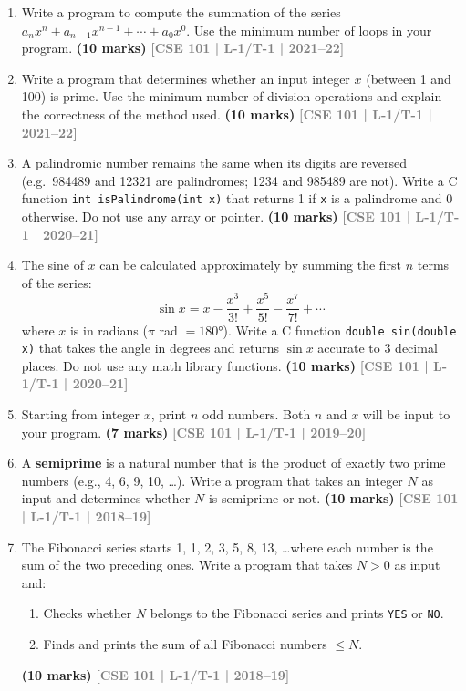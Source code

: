 \documentclass[12pt,a3paper]{article}
\newcommand{\yr}[1]{\hfill\textcolor{gray}{\small\textbf{[#1]}}}
\newcommand{\mk}[1]{\textcolor{orange!70!black}{\small\textbf{(#1 marks)}}}
\begin{document}
\begin{enumerate}
\begin{lstlisting}
int a[10];
int i, j;
j = last_digit_of_your_studentID;
for (i=0; i<10; i++)
    a[i] = 5-i;
printf("%d\n", a[j]);
\end{lstlisting}
Show your calculation.
\mk{7} \yr{CSE 101 | L-1/T-1 | 2022--23}

\item Write a program to compute the summation of the series $a_n x^n + a_{n-1} x^{n-1} + \cdots + a_0 x^0$. Use the minimum number of loops in your program.
\mk{10} \yr{CSE 101 | L-1/T-1 | 2021--22}

\item Write a program that determines whether an input integer $x$ (between 1 and 100) is prime. Use the minimum number of division operations and explain the correctness of the method used.
\mk{10} \yr{CSE 101 | L-1/T-1 | 2021--22}

\item A palindromic number remains the same when its digits are reversed (e.g.\ 984489 and 12321 are palindromes; 1234 and 985489 are not). Write a C function \texttt{int isPalindrome(int x)} that returns 1 if \texttt{x} is a palindrome and 0 otherwise. Do not use any array or pointer.
\mk{10} \yr{CSE 101 | L-1/T-1 | 2020--21}

\item The sine of $x$ can be calculated approximately by summing the first $n$ terms of the series:
\[ \sin x = x - \frac{x^3}{3!} + \frac{x^5}{5!} - \frac{x^7}{7!} + \cdots \]
where $x$ is in radians ($\pi$ rad $= 180°$). Write a C function \texttt{double sin(double x)} that takes the angle in degrees and returns $\sin x$ accurate to 3 decimal places. Do not use any math library functions.
\mk{10} \yr{CSE 101 | L-1/T-1 | 2020--21}

\item Starting from integer $x$, print $n$ odd numbers. Both $n$ and $x$ will be input to your program.
\mk{7} \yr{CSE 101 | L-1/T-1 | 2019--20}

\item A \textbf{semiprime} is a natural number that is the product of exactly two prime numbers (e.g., 4, 6, 9, 10, \ldots). Write a program that takes an integer $N$ as input and determines whether $N$ is semiprime or not.
\mk{10} \yr{CSE 101 | L-1/T-1 | 2018--19}

\item The Fibonacci series starts 1, 1, 2, 3, 5, 8, 13, \ldots where each number is the sum of the two preceding ones. Write a program that takes $N > 0$ as input and:
\begin{enumerate}
  \item Checks whether $N$ belongs to the Fibonacci series and prints \texttt{YES} or \texttt{NO}.
  \item Finds and prints the sum of all Fibonacci numbers $\le N$.
\end{enumerate}
\mk{10} \yr{CSE 101 | L-1/T-1 | 2018--19}


\end{enumerate}
\end{document}
